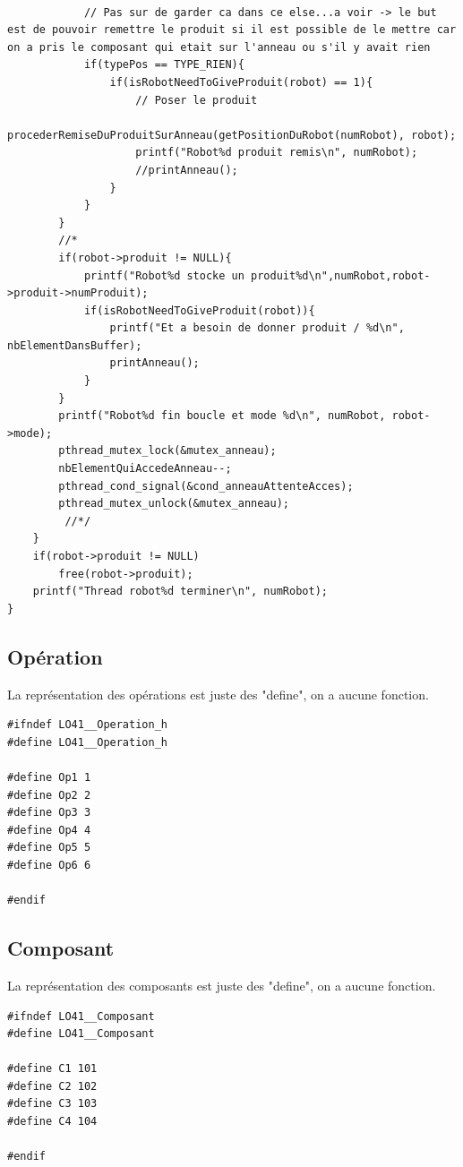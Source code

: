 \documentclass{report}
\begin{document}
\begin{lstlisting}[caption=Fonction thread des robots]
            
            // Pas sur de garder ca dans ce else...a voir -> le but est de pouvoir remettre le produit si il est possible de le mettre car on a pris le composant qui etait sur l'anneau ou s'il y avait rien
            if(typePos == TYPE_RIEN){
                if(isRobotNeedToGiveProduit(robot) == 1){
                    // Poser le produit
                    procederRemiseDuProduitSurAnneau(getPositionDuRobot(numRobot), robot);
                    printf("Robot%d produit remis\n", numRobot);
                    //printAnneau();
                }
            }
        }
        //*
        if(robot->produit != NULL){
            printf("Robot%d stocke un produit%d\n",numRobot,robot->produit->numProduit);
            if(isRobotNeedToGiveProduit(robot)){
                printf("Et a besoin de donner produit / %d\n", nbElementDansBuffer);
                printAnneau();
            }
        }
        printf("Robot%d fin boucle et mode %d\n", numRobot, robot->mode);
        pthread_mutex_lock(&mutex_anneau);
        nbElementQuiAccedeAnneau--;
        pthread_cond_signal(&cond_anneauAttenteAcces);
        pthread_mutex_unlock(&mutex_anneau);
         //*/
    }
    if(robot->produit != NULL)
        free(robot->produit);
    printf("Thread robot%d terminer\n", numRobot);
}
\end{lstlisting}
\subsection{Opération}
La représentation des opérations est juste des "define", on a aucune fonction.
\begin{lstlisting}[caption=Représentation des opérations]
#ifndef LO41__Operation_h
#define LO41__Operation_h

#define Op1 1
#define Op2 2
#define Op3 3
#define Op4 4
#define Op5 5
#define Op6 6

#endif
\end{lstlisting}

\subsection{Composant}
La représentation des composants est juste des "define", on a aucune fonction.
\begin{lstlisting}[caption=Représentation des composants]
#ifndef LO41__Composant
#define LO41__Composant

#define C1 101
#define C2 102
#define C3 103
#define C4 104

#endif 
\end{lstlisting}
\end{document}
